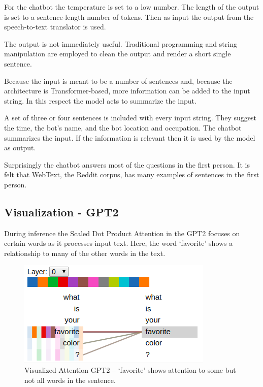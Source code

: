 
For the chatbot the temperature is set to a low number. The length of the output is set to a sentence-length number of tokens. Then as input the output from the speech-to-text translator is used.

The output is not immediately useful. Traditional programming and string manipulation are employed to clean the output and render a short single sentence. %

Because the input is meant to be a number of sentences and, because the architecture is Transformer-based, more information can be added to the input string. In this respect the model acts to summarize the input. 

A set of three or four sentences is included with every input string. They suggest the time, the bot's name, and the bot location and occupation. The chatbot summarizes the input. If the information is relevant then it is used by the model as output. %

Surprisingly the chatbot answers most of the questions in the first person. It is felt that WebText, the Reddit corpus, has many examples of sentences in the first person.

\subsection{Visualization - GPT2}

During inference the Scaled Dot Product Attention in the GPT2 focuses on certain words as it processes input text. Here, the word `favorite' shows a relationship to many of the other words in the text.  

\begin{figure}[H]
	\begin{center}
		\includegraphics[scale=2]{Figure_4}
		
		
	\end{center}
	\caption[Visualized Attention GPT2]{Visualized Attention GPT2 -- `favorite' shows attention to some but not all words in the sentence.}
	\label{diagram-vis04}
	
\end{figure}

